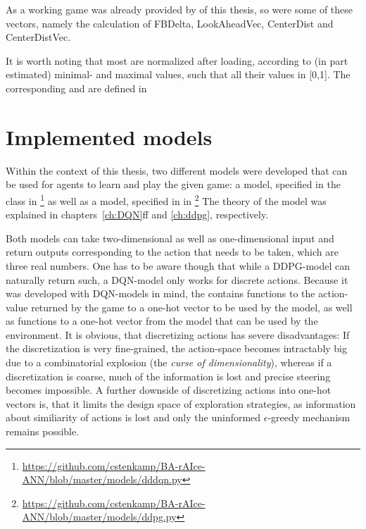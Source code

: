 As a working game was already provided by \leon of this thesis, so were some of these vectors, namely the calculation of FBDelta, LookAheadVec, CenterDist and CenterDistVec.

It is worth noting that most  are normalized after loading, according to (in part estimated) minimal- and maximal values, such that all their values in [0,1]. The corresponding  and  are defined in 

\section{Implemented models}

Within the context of this thesis, two different models were developed that can be used for agents to learn and play the given game: a  model, specified in the class  in \footnote{\url{https://github.com/cstenkamp/BA-rAIce-ANN/blob/master/models/dddqn.py}} as well as a  model, specified in  in \footnote{\url{https://github.com/cstenkamp/BA-rAIce-ANN/blob/master/models/ddpg.py}} The theory of the model was explained in chapters~\ref{ch:DQN}ff and \ref{ch:ddpg}, respectively. 

Both models can take two-dimensional as well as one-dimensional input and return outputs corresponding to the action that needs to be taken, which are three real numbers. One has to be aware though that while a DDPG-model can naturally return such, a DQN-model only works for discrete actions. Because it was developed with DQN-models in mind, the  contains functions to  the action-value returned by the game to a one-hot vector to be used by the model, as well as functions to  a one-hot vector from the model that can be used by the environment. It is obvious, that discretizing actions has severe disadvantages: If the discretization is very fine-grained, the action-space becomes intractably big due to a combinatorial explosion (the \textit{curse of dimensionality}), whereas if a discretization is coarse, much of the information is lost and precise steering becomes impossible. A further downside of discretizing actions into one-hot vectors is, that it limits the design space of exploration strategies, as information about similiarity of actions is lost and only the uninformed $\epsilon$-greedy mechanism remains possible.



